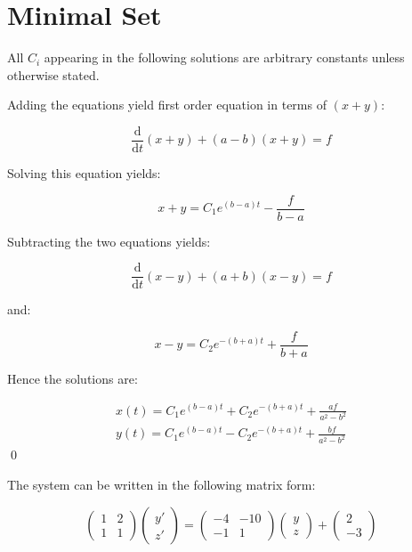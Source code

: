 \documentclass[12pt]{article}
\begin{document}



\pagebreak
\section*{Minimal Set}


All $C_{i}$ appearing in the following solutions are arbitrary constants unless otherwise stated.


Adding the equations yield first order equation in terms of $(x + y)$:

\begin{equation}
    \frac{\mathrm{d}}{\mathrm{d}t} (x + y) + (a - b)(x + y) = f
\end{equation}

Solving this equation yields:

\begin{equation}
    x + y = C_{1} e^{(b - a)t} - \frac{f}{b - a}
\end{equation}

Subtracting the two equations yields:

\begin{equation}
    \frac{\mathrm{d}}{\mathrm{d}t} (x - y) + (a + b)(x - y) = f
\end{equation}

and:

\begin{equation}
    x - y = C_{2} e^{-(b + a)t} + \frac{f}{b + a}
\end{equation}

Hence the solutions are:

\begin{equation}
    \begin{split}
        x(t) = C_{1} e^{(b - a)t} + C_{2} e^{-(b + a)t} + \frac{af}{a^{2} - b^{2}} \\
        y(t) = C_{1} e^{(b - a)t} - C_{2} e^{-(b + a)t} + \frac{bf}{a^{2} - b^{2}}
    \end{split}
\end{equation}
\qed


The system can be written in the following matrix form:

\begin{equation}
    \begin{pmatrix}
        1 & 2 \\
        1 & 1
    \end{pmatrix}
    \begin{pmatrix}
        y' \\
        z'
    \end{pmatrix}
    =
    \begin{pmatrix}
        -4 & -10 \\
        -1 & 1
    \end{pmatrix}
    \begin{pmatrix}
        y \\
        z
    \end{pmatrix}
    +
    \begin{pmatrix}
        2 \\
        -3
    \end{pmatrix}
\end{equation}
\end{document}
